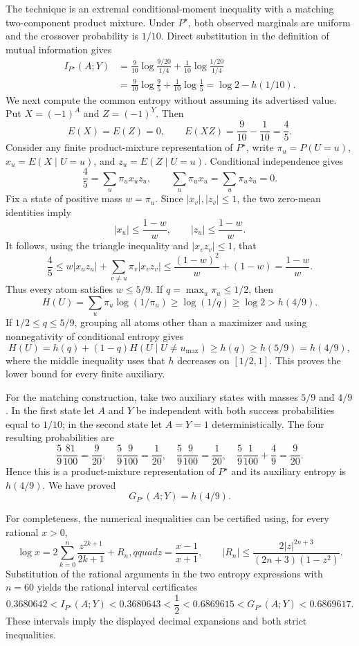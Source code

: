 The technique is an extremal conditional-moment inequality with a matching two-component product mixture.  Under \(P^\star\), both observed marginals are uniform and the crossover probability is \(1/10\).  Direct substitution in the definition of mutual information gives
\[
 \begin{aligned}
 I_{P^\star}(A;Y)
 &=\frac9{10}\log\frac{9/20}{1/4}+\frac1{10}\log\frac{1/20}{1/4}\\
 &=\frac9{10}\log\frac95+\frac1{10}\log\frac15
 =\log2-h(1/10).
 \end{aligned}
\]
We next compute the common entropy without assuming its advertised value.  Put \(X=(-1)^A\) and \(Z=(-1)^Y\).  Then
\[
 E(X)=E(Z)=0,\qquad E(XZ)=\frac9{10}-\frac1{10}=\frac45.
\]
Consider any finite product-mixture representation of \(P^\star\), write \(\pi_u=P(U=u)\), \(x_u=E(X\mid U=u)\), and \(z_u=E(Z\mid U=u)\).  Conditional independence gives
\[
 \frac45=\sum_u\pi_u x_uz_u,
 \qquad \sum_u\pi_u x_u=\sum_u\pi_u z_u=0.
\]
Fix a state of positive mass \(w=\pi_u\).  Since \(|x_v|,|z_v|\leq1\), the two zero-mean identities imply
\[
 |x_u|\leq\frac{1-w}{w},\qquad
 |z_u|\leq\frac{1-w}{w}.
\]
It follows, using the triangle inequality and \(|x_vz_v|\leq1\), that
\[
 \frac45
 \leq w|x_uz_u|+\sum_{v\neq u}\pi_v|x_vz_v|
 \leq \frac{(1-w)^2}{w}+(1-w)
 =\frac{1-w}{w}.
\]
Thus every atom satisfies \(w\leq5/9\).  If \(q=\max_u\pi_u\leq1/2\), then
\[
 H(U)=\sum_u\pi_u\log(1/\pi_u)\geq\log(1/q)\geq\log2>h(4/9).
\]
If \(1/2\leq q\leq5/9\), grouping all atoms other than a maximizer and using nonnegativity of conditional entropy gives
\[
 H(U)=h(q)+(1-q)H(U\mid U\neq u_{\max})
 \geq h(q)\geq h(5/9)=h(4/9),
\]
where the middle inequality uses that \(h\) decreases on \([1/2,1]\).  This proves the lower bound for every finite auxiliary.

For the matching construction, take two auxiliary states with masses \(5/9\) and \(4/9\).  In the first state let \(A\) and \(Y\) be independent with both success probabilities equal to \(1/10\); in the second state let \(A=Y=1\) deterministically.  The four resulting probabilities are
\[
 \frac59\frac{81}{100}=\frac9{20},\quad
 \frac59\frac9{100}=\frac1{20},\quad
 \frac59\frac9{100}=\frac1{20},\quad
 \frac59\frac1{100}+\frac49=\frac9{20}.
\]
Hence this is a product-mixture representation of \(P^\star\) and its auxiliary entropy is \(h(4/9)\).  We have proved
\[
 G_{P^\star}(A;Y)=h(4/9).
\]

For completeness, the numerical inequalities can be certified using, for every rational \(x>0\),
\[
 \log x=2\sum_{k=0}^{n}\frac{z^{2k+1}}{2k+1}+R_n,qquad
 z=\frac{x-1}{x+1},\qquad
 |R_n|\leq\frac{2|z|^{2n+3}}{(2n+3)(1-z^2)}.
\]
Substitution of the rational arguments in the two entropy expressions with \(n=60\) yields the rational interval certificates
\[
 0.3680642<I_{P^\star}(A;Y)<0.3680643<\frac12
 <0.6869615<G_{P^\star}(A;Y)<0.6869617.
\]
These intervals imply the displayed decimal expansions and both strict inequalities.

